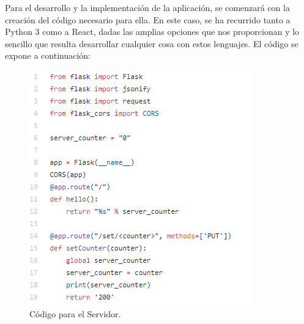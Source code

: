 \documentclass[english,runningheads,a4paper]{llncs}[2018/03/10]
\begin{document}
Para el desarrollo y la implementación de la aplicación, se comenzará con la
creación del código necesario para ella. En este caso, se ha recurrido tanto a
Python 3 como a React, dadas las amplias opciones que nos proporcionan y lo
sencillo que resulta desarrollar cualquier cosa con estos lenguajes. El código se
expone a continuación:

\begin{figure}[h!]
 \includegraphics[width=\linewidth]{./Web/Azure/CodigoServer.png}
 \caption{Código para el Servidor.}
\end{figure}
\end{document}
